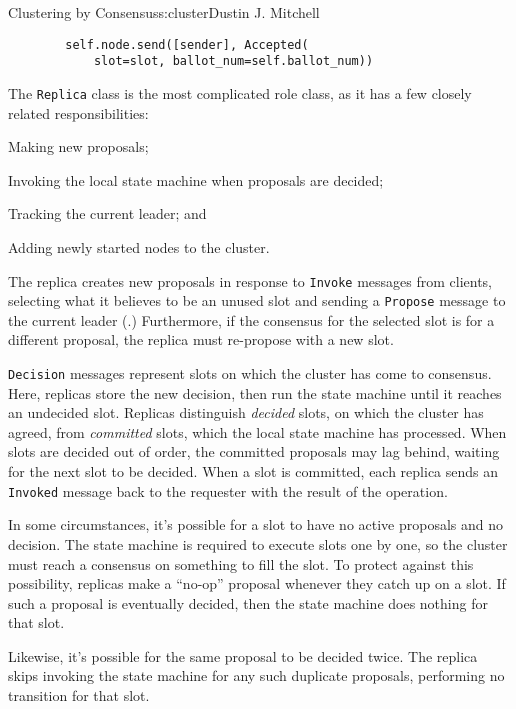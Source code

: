 \begin{aosachapter}{Clustering by Consensus}{s:cluster}{Dustin J. Mitchell}
\begin{verbatim}
        self.node.send([sender], Accepted(
            slot=slot, ballot_num=self.ballot_num))
\end{verbatim}

\label{replica}

The \texttt{Replica} class is the most complicated role class, as it has
a few closely related responsibilities:

\begin{aosaitemize}

\item
  Making new proposals;
\item
  Invoking the local state machine when proposals are decided;
\item
  Tracking the current leader; and
\item
  Adding newly started nodes to the cluster.
\end{aosaitemize}

The replica creates new proposals in response to \texttt{Invoke}
messages from clients, selecting what it believes to be an unused slot
and sending a \texttt{Propose} message to the current leader
(.) Furthermore, if the consensus for
the selected slot is for a different proposal, the replica must
re-propose with a new slot.


\texttt{Decision} messages represent slots on which the cluster has come
to consensus. Here, replicas store the new decision, then run the state
machine until it reaches an undecided slot. Replicas distinguish
\emph{decided} slots, on which the cluster has agreed, from
\emph{committed} slots, which the local state machine has processed.
When slots are decided out of order, the committed proposals may lag
behind, waiting for the next slot to be decided. When a slot is
committed, each replica sends an \texttt{Invoked} message back to the
requester with the result of the operation.

In some circumstances, it's possible for a slot to have no active
proposals and no decision. The state machine is required to execute
slots one by one, so the cluster must reach a consensus on something to
fill the slot. To protect against this possibility, replicas make a
``no-op'' proposal whenever they catch up on a slot. If such a proposal
is eventually decided, then the state machine does nothing for that
slot.

Likewise, it's possible for the same proposal to be decided twice. The
replica skips invoking the state machine for any such duplicate
proposals, performing no transition for that slot.


\end{aosachapter}
